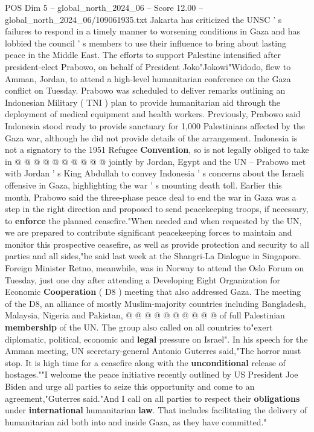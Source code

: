 \begin{textsample}{POS Dim 5 – global\_north\_2024\_06 – Score 12.00 – global\_north\_2024\_06/109061935.txt}
Jakarta has criticized the UNSC ' s failures to respond in a timely manner to worsening conditions in Gaza and has lobbied the council ' s members to use their influence to bring about lasting peace in the Middle East.
The efforts to support Palestine intensified after president-elect Prabowo, on behalf of President Joko"Jokowi"Widodo, flew to Amman, Jordan, to attend a high-level humanitarian conference on the Gaza conflict on Tuesday.
Prabowo was scheduled to deliver remarks outlining an Indonesian Military ( TNI ) plan to provide humanitarian aid through the deployment of medical equipment and health workers.
Previously, Prabowo said Indonesia stood ready to provide sanctuary for 1,000 Palestinians affected by the Gaza war, although he did not provide details of the arrangement.
Indonesia is not a signatory to the 1951 Refugee \textbf{Convention}, so is not legally obliged to take in @ @ @ @ @ @ @ @ @ @ jointly by Jordan, Egypt and the UN -- Prabowo met with Jordan ' s King Abdullah to convey Indonesia ' s concerns about the Israeli offensive in Gaza, highlighting the war ' s mounting death toll.
Earlier this month, Prabowo said the three-phase peace deal to end the war in Gaza was a step in the right direction and proposed to send peacekeeping troops, if necessary, to \textbf{enforce} the planned ceasefire."When needed and when requested by the UN, we are prepared to contribute significant peacekeeping forces to maintain and monitor this prospective ceasefire, as well as provide protection and security to all parties and all sides,"he said last week at the Shangri-La Dialogue in Singapore.
Foreign Minister Retno, meanwhile, was in Norway to attend the Oslo Forum on Tuesday, just one day after attending a Developing Eight Organization for Economic \textbf{Cooperation} ( D8 ) meeting that also addressed Gaza.
The meeting of the D8, an alliance of mostly Muslim-majority countries including Bangladesh, Malaysia, Nigeria and Pakistan, @ @ @ @ @ @ @ @ @ @ of full Palestinian \textbf{membership} of the UN.
The group also called on all countries to"exert diplomatic, political, economic and \textbf{legal} pressure on Israel".
In his speech for the Amman meeting, UN secretary-general Antonio Guterres said,"The horror must stop.
It is high time for a ceasefire along with the \textbf{unconditional} release of hostages.""I welcome the peace initiative recently outlined by US President Joe Biden and urge all parties to seize this opportunity and come to an agreement,"Guterres said."And I call on all parties to respect their \textbf{obligations} under \textbf{international} humanitarian \textbf{law}.
That includes facilitating the delivery of humanitarian aid both into and inside Gaza, as they have committed."

\end{textsample}
